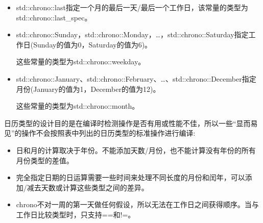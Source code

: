 \begin{itemize}
\item
std::chrono::last指定一个月的最后一天/最后一个工作日，该常量的类型为std::chrono::last\_spec。

\item
std::chrono::Sunday，std::chrono::Monday，…，std::chrono::Saturday指定工作日(Sunday的值为0，Saturday的值为6)。

这些常量的类型为std::chrono::weekday。

\item
std::chrono::January、std::chrono::February、…、std::chrono::December指定月份(January的值为1，December的值为12)。

这些常量的类型为std::chrono::month。
\end{itemize}


日历类型的设计目的是在编译时检测操作是否有用或性能不佳，所以一些“显而易见”的操作不会按照表中列出的日历类型的标准操作进行编译:

\begin{itemize}
\item
日和月的计算取决于年份。不能添加天数/月份，也不能计算没有年份的所有月份类型的差值。

\item
完全指定日期的日运算需要一些时间来处理不同长度的月份和闰年，可以添加/减去天数或计算这些类型之间的差异。

\item
chrono不对一周的第一天做任何假设，所以无法在工作日之间获得顺序。当与工作日比较类型时，只支持==和!=。
\end{itemize}

